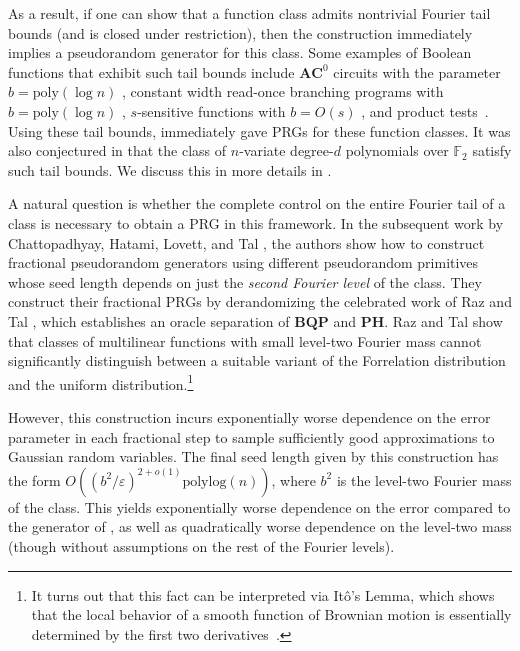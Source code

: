 \documentclass[10pt,a4paper]{article}
\newcommand{\eps}{\varepsilon}
\theoremstyle{definition}
\begin{document}
As a result, if one can show that a function class admits nontrivial Fourier tail bounds (and is closed under restriction), then the \cite{CHHL} construction immediately implies a pseudorandom generator for this class. Some examples of Boolean functions that exhibit such tail bounds include $\mathbf{AC}^0$ circuits with the parameter $b =\mathrm{poly}(\log n)$ \cite{LMN89,tal2017tight}, constant width read-once branching programs with $b =\mathrm{poly}(\log n)$ \cite{chattopadhyay2018improved}, $s$-sensitive functions with $b=O(s)$ \cite{GSW16,GSTW}, and product tests~\cite{DBLP:conf/coco/Lee19}. Using these tail bounds, \cite{CHHL} immediately gave  
PRGs for these function classes. It was also conjectured in \cite{CHHL} that the class of $n$-variate degree-$d$ polynomials over $\mathbb{F}_2$ satisfy such tail bounds.  We discuss this in more details in .

A natural question is whether the complete control on the entire Fourier tail of a class is necessary to obtain a PRG in this framework. In the subsequent work by Chattopadhyay, Hatami, Lovett, and Tal \cite{CHLT}, the authors show how to construct fractional pseudorandom generators using different pseudorandom primitives whose seed length depends on just the \emph{second Fourier level} of the class. They construct their fractional PRGs by derandomizing the celebrated work of Raz and Tal \cite{RazTal}, which establishes an oracle separation of $\mathbf{BQP}$ and $\mathbf{PH}$.  Raz and Tal show that classes of multilinear functions with small level-two Fourier mass cannot significantly distinguish between a suitable variant of the Forrelation distribution and the uniform distribution.\footnote{It turns out that this fact can be interpreted via It\^o's Lemma, which shows that the local behavior of a smooth function of Brownian motion is essentially determined by the first two derivatives~\cite{wu2020stochastic}.}

However, this construction incurs exponentially worse dependence on the error parameter in each fractional step to sample sufficiently good approximations to Gaussian random variables. The final seed length given by this construction has the form $O((b^2/\eps)^{2+o(1)} \mathrm{polylog}(n))$, where $b^2$ is the level-two Fourier mass of the class. This yields exponentially worse dependence on the error compared to the generator of \cite{CHHL}, as well as quadratically worse dependence on the level-two mass (though {without assumptions on the} rest of the Fourier levels).
\end{document}
